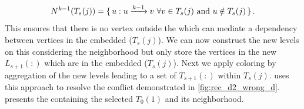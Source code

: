 \begin{equation*}
	   N^{k-1}(T_s(j)) = \set{u : u \xrightarrow{k-1} v \text{  } \forall v \in T_s(j) \text { and } u \notin T_s(j)}.
\end{equation*}
This ensures that there is no vertex outside the \subgraph which can mediate a \DK dependency between vertices in the embedded \levelGroup ($T_s(j)$). We can now construct the new levels on this \subgraph considering the neighborhood but only store the vertices in the new \levels $L_{s+1}(:)$ which are in the embedded \levelGroup ($T_s(j)$). Next we apply \DK coloring by aggregation of the new levels leading to a set of \levelGroups $T_{s+1}(:)$ within $T_s(j)$.  uses this approach to resolve the conflict demonstrated in \cref{fig:rec_d2_wrong_d}.  presents the \subgraph containing the selected \levelGroup $T_0(1)$ and its \DONE neighborhood. %
